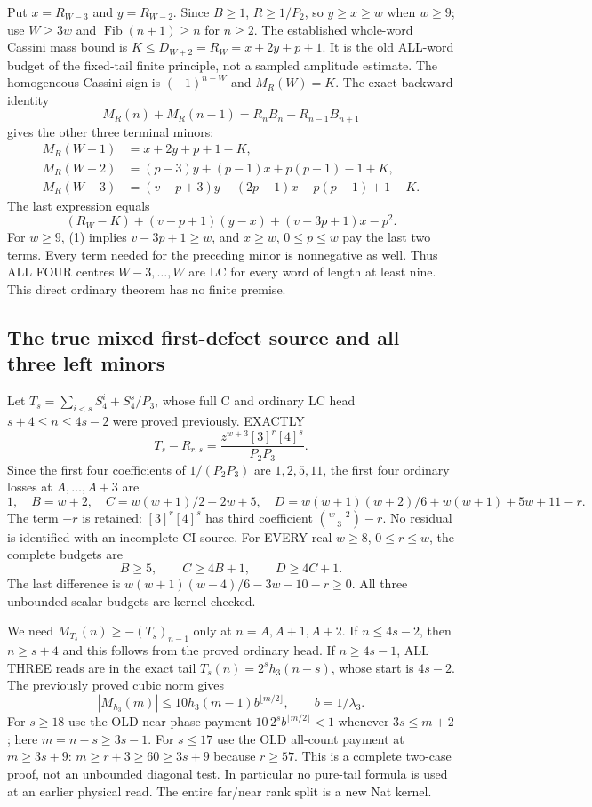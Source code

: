 Put $x=R_{W-3}$ and $y=R_{W-2}$. Since $B\ge1$,
$R\ge1/P_2$, so $y\ge x\ge w$ when $w\ge9$; use
$W\ge3w$ and $\operatorname{Fib}(n+1)\ge n$ for $n\ge2$.
The established whole-word Cassini mass bound is
$K\le D_{W+2}=R_W=x+2y+p+1$.
It is the old ALL-word budget of the fixed-tail finite principle,
not a sampled amplitude estimate. The homogeneous Cassini sign is
$(-1)^{n-W}$ and $M_R(W)=K$.
The exact backward identity
\[
 M_R(n)+M_R(n-1)=R_nB_n-R_{n-1}B_{n+1}
\]
gives the other three terminal minors:
\[
\begin{split}
 M_R(W-1)&=x+2y+p+1-K,\\
 M_R(W-2)&=(p-3)y+(p-1)x+p(p-1)-1+K,\\
 M_R(W-3)&=(v-p+3)y-(2p-1)x-p(p-1)+1-K.
\end{split}                                                    \tag{2}
\]
The last expression equals
\[
 (R_W-K)+(v-p+1)(y-x)+(v-3p+1)x-p^2.               \tag{3}
\]
For $w\ge9$, (1) implies $v-3p+1\ge w$, and $x\ge w$,
$0\le p\le w$ pay the last two terms. Every term needed for
the preceding minor is nonnegative as well. Thus ALL FOUR centres
$W-3,\ldots,W$ are LC for every word of length at least nine.
This direct ordinary theorem has no finite premise.

\subsection{The true mixed first-defect source and all three left minors}
Let $T_s=\sum_{i<s}S_4^i+S_4^s/P_3$, whose full C and ordinary
LC head $s+4\le n\le4s-2$ were proved previously. EXACTLY
\[
 T_s-R_{r,s}=\frac{z^{w+3}[3]^r[4]^s}{P_2P_3}.       \tag{4}
\]
Since the first four coefficients of $1/(P_2P_3)$ are
$1,2,5,11$, the first four ordinary losses at $A,\ldots,A+3$ are
\[
 1,\quad B=w+2,\quad C=w(w+1)/2+2w+5,
\quad D=w(w+1)(w+2)/6+w(w+1)+5w+11-r.              \tag{5}
\]
The term $-r$ is retained: $[3]^r[4]^s$ has third coefficient
$\binom{w+2}{3}-r$. No residual is identified with an incomplete CI source.
For EVERY real $w\ge8$, $0\le r\le w$, the complete budgets are
\[
 B\ge5,\qquad C\ge4B+1,\qquad D\ge4C+1.             \tag{6}
\]
The last difference is $w(w+1)(w-4)/6-3w-10-r\ge0$.
All three unbounded scalar budgets are kernel checked.

We need $M_{T_s}(n)\ge-(T_s)_{n-1}$ only at $n=A,A+1,A+2$.
If $n\le4s-2$, then $n\ge s+4$ and this follows from the proved
ordinary head. If $n\ge4s-1$, ALL THREE reads are in the exact tail
$T_s(n)=2^s h_3(n-s)$, whose start is $4s-2$.
The previously proved cubic norm gives
\[
 |M_{h_3}(m)|\le10h_3(m-1)b^{\lfloor m/2\rfloor},\qquad b=1/\lambda_3.
\]
For $s\ge18$ use the OLD near-phase payment
$10\,2^s b^{\lfloor m/2\rfloor}<1$ whenever $3s\le m+2$;
here $m=n-s\ge3s-1$. For $s\le17$ use the OLD all-count payment
at $m\ge3s+9$: $m\ge r+3\ge60\ge3s+9$ because $r\ge57$.
This is a complete two-case proof, not an unbounded diagonal test.
In particular no pure-tail formula is used at an earlier physical read.
The entire far/near rank split is a new Nat kernel.

